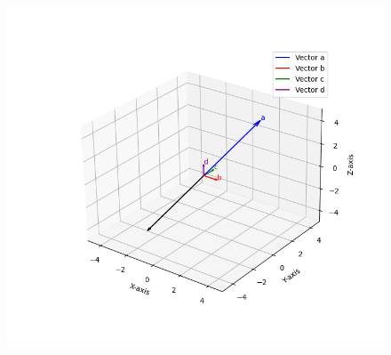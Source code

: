 \documentclass[journal]{IEEEtran}
\begin{document}
\begin{figure}[H]
   \centering
  \includegraphics[width=0.7\columnwidth]{figs/fig1.png}
   \caption{}
   \label{fig:1}
\end{figure}
\end{document}
